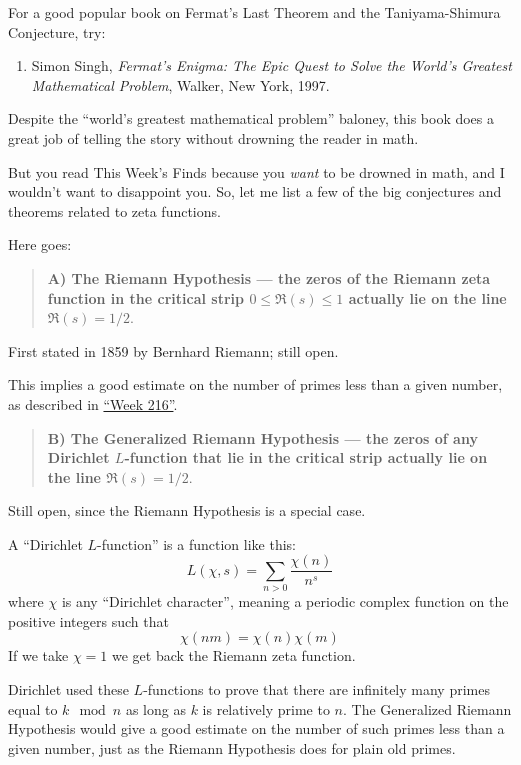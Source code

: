 \documentclass{article}
\def\tightlist{}
\begin{document}
For a good popular book on Fermat's Last Theorem and the
Taniyama-Shimura Conjecture, try:

\begin{enumerate}
\def\labelenumi{\arabic{enumi})}
\tightlist
\item
  Simon Singh, \emph{Fermat's Enigma: The Epic Quest to Solve the
  World's Greatest Mathematical Problem}, Walker, New York, 1997.
\end{enumerate}

Despite the ``world's greatest mathematical problem'' baloney, this book
does a great job of telling the story without drowning the reader in
math.

But you read This Week's Finds because you \emph{want} to be drowned in
math, and I wouldn't want to disappoint you. So, let me list a few of
the big conjectures and theorems related to zeta functions.

Here goes:

\begin{quote}
\textbf{A) The Riemann Hypothesis --- the zeros of the Riemann zeta
function in the critical strip \(0 \leqslant \Re(s) \leqslant 1\)
actually lie on the line \(\Re(s) = 1/2.\)}
\end{quote}

First stated in 1859 by Bernhard Riemann; still open.

This implies a good estimate on the number of primes less than a given
number, as described in \protect\hyperlink{week216}{``Week 216''}.

\begin{quote}
\textbf{B) The Generalized Riemann Hypothesis --- the zeros of any
Dirichlet \(L\)-function that lie in the critical strip actually lie on
the line \(\Re(s) = 1/2.\)}
\end{quote}

Still open, since the Riemann Hypothesis is a special case.

A ``Dirichlet \(L\)-function'' is a function like this:
\[L(\chi,s) = \sum_{n>0} \frac{\chi(n)}{n^s}\] where \(\chi\) is any
``Dirichlet character'', meaning a periodic complex function on the
positive integers such that \[\chi(nm) = \chi(n) \chi(m)\] If we take
\(\chi = 1\) we get back the Riemann zeta function.

Dirichlet used these \(L\)-functions to prove that there are infinitely
many primes equal to \(k \mod n\) as long as \(k\) is relatively prime
to \(n\). The Generalized Riemann Hypothesis would give a good estimate
on the number of such primes less than a given number, just as the
Riemann Hypothesis does for plain old primes.
\end{document}
